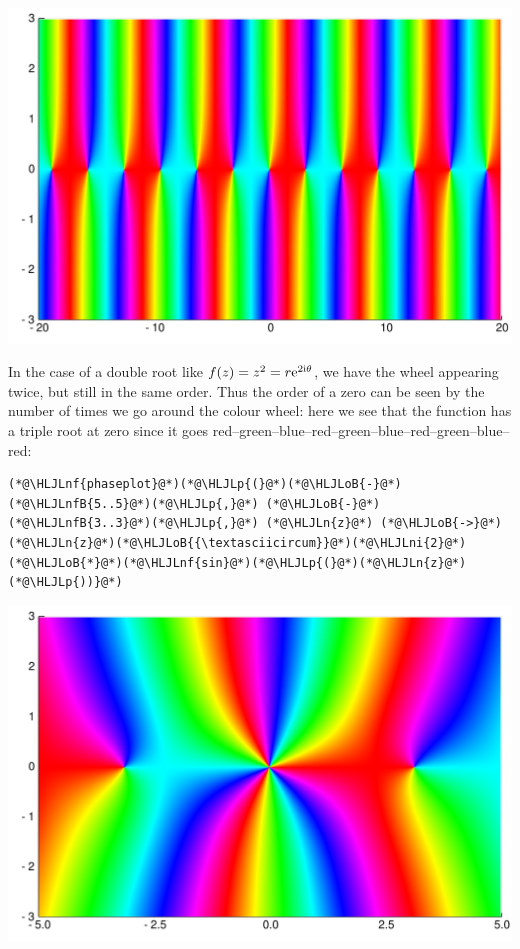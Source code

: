 \documentclass[12pt,a4paper]{article}
\newcommand{\HLJLn}[1]{#1}
\newcommand{\HLJLnf}[1]{\textcolor[RGB]{66,102,213}{#1}}
\newcommand{\HLJLnfB}[1]{\textcolor[RGB]{59,151,46}{#1}}
\newcommand{\HLJLni}[1]{\textcolor[RGB]{59,151,46}{#1}}
\newcommand{\HLJLoB}[1]{\textcolor[RGB]{102,102,102}{\textbf{#1}}}
\newcommand{\HLJLp}[1]{#1}
\def\I{ {\rm i} }
\def\E{ {\rm e} }
\def\endash{–}
\begin{document}
\includegraphics[width=\linewidth]{figures/Lecture1_7_1.pdf}

In the case of a double root like $f(z) = z^2 = r \E^{2 \I \theta}$, we have the wheel appearing twice, but still in the same order. Thus the order of a zero can be seen by the number of times we go around the colour wheel: here we see that the function has a triple root at zero since it goes red\ensuremath{\endash}green\ensuremath{\endash}blue\ensuremath{\endash}red\ensuremath{\endash}green\ensuremath{\endash}blue\ensuremath{\endash}red\ensuremath{\endash}green\ensuremath{\endash}blue\ensuremath{\endash}red:


\begin{lstlisting}
(*@\HLJLnf{phaseplot}@*)(*@\HLJLp{(}@*)(*@\HLJLoB{-}@*)(*@\HLJLnfB{5..5}@*)(*@\HLJLp{,}@*) (*@\HLJLoB{-}@*)(*@\HLJLnfB{3..3}@*)(*@\HLJLp{,}@*) (*@\HLJLn{z}@*) (*@\HLJLoB{->}@*) (*@\HLJLn{z}@*)(*@\HLJLoB{{\textasciicircum}}@*)(*@\HLJLni{2}@*)(*@\HLJLoB{*}@*)(*@\HLJLnf{sin}@*)(*@\HLJLp{(}@*)(*@\HLJLn{z}@*)(*@\HLJLp{))}@*)
\end{lstlisting}

\includegraphics[width=\linewidth]{figures/Lecture1_8_1.pdf}
\end{document}
